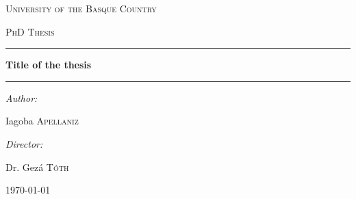 


\begin{center}

\vspace*{20pt}
\textsc{\LARGE University of the Basque Country}

\vspace{20pt}
\textsc{\Large PhD Thesis}

\vspace{50pt} 
\hrule 

\vspace{16pt}
{ \huge \bfseries Title of the thesis}
\vspace{16pt}

\hrule
\vspace{40pt}

\begin{minipage}{0.4\textwidth}
\begin{flushleft} \large
\emph{Author:}

Iagoba \textsc{Apellaniz}
\end{flushleft}
\end{minipage}
\begin{minipage}{0.4\textwidth}
\begin{flushright} \large
\emph{Director:}

Dr. Gez\'a \textsc{T\'oth}
\end{flushright}
\end{minipage}

\vfill

{\large \today}

\end{center}

\cleardoublepage